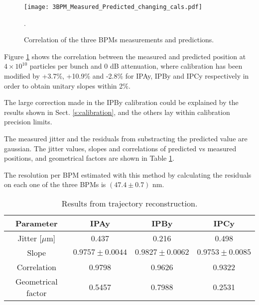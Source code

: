 \begin{figure}[!htb]
\centering%
 \texttt{[image: 3BPM\_Measured\_Predicted\_changing\_cals.pdf]}\caption{Correlation of the three BPMs measurements and predictions.}\label{f:3BPMpredictions}.
\end{figure}
Figure \ref{f:3BPMpredictions} shows the correlation between the measured and predicted position at $4\times10^{10}$ particles per bunch and 0 dB attenuation, where calibration has been modified by +3.7\%, +10.9\% and -2.8\% for IPAy, IPBy and IPCy respectively in order to obtain unitary slopes within 2\%.\par
The large correction made in the IPBy calibration could be explained by the results shown in Sect. \ref{s:calibration}, and the others lay within calibration precision limits.\par
The measured jitter and the residuals from substracting the predicted value are gaussian. The jitter values, slopes and correlations of predicted vs measured positions, and geometrical factors are shown in Table \ref{t:resodata}.\par
The resolution per BPM estimated with this method by calculating the residuals on each one of the three BPMs is $(47.4\pm0.7)$ nm.\par
\begin{table}[hbt]
\centering
\begin{tabular}{c||c|c|c}\hline
Parameter & IPAy & IPBy & IPCy\\ \hline\hline
Jitter [$\mu$m] & 0.437 & 0.216 & 0.498\\\hline
Slope & $0.9757\pm0.0044$ & $0.9827\pm0.0062$ & $0.9753\pm0.0085$\\\hline
Correlation & 0.9798 & 0.9626 & 0.9322 \\\hline
Geometrical factor & 0.5457 & 0.7988 & 0.2531\\\hline
\end{tabular}\caption{Results from trajectory reconstruction.}\label{t:resodata}
\end{table}
